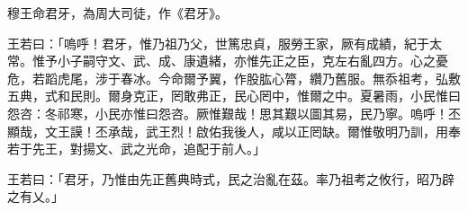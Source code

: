 
\begin{pinyinscope}
穆王命君牙，為周大司徒，作《君牙》。

王若曰：「嗚呼！君牙，惟乃祖乃父，世篤忠貞，服勞王家，厥有成績，紀于太常。惟予小子嗣守文、武、成、康遺緒，亦惟先正之臣，克左右亂四方。心之憂危，若蹈虎尾，涉于春冰。今命爾予翼，作股肱心膂，纘乃舊服。無忝祖考，弘敷五典，式和民則。爾身克正，罔敢弗正，民心罔中，惟爾之中。夏暑雨，小民惟曰怨咨：冬祁寒，小民亦惟曰怨咨。厥惟艱哉！思其艱以圖其易，民乃寧。嗚呼！丕顯哉，文王謨！丕承哉，武王烈！啟佑我後人，咸以正罔缺。爾惟敬明乃訓，用奉若于先王，對揚文、武之光命，追配于前人。」

王若曰：「君牙，乃惟由先正舊典時式，民之治亂在茲。率乃祖考之攸行，昭乃辟之有乂。」


\end{pinyinscope}